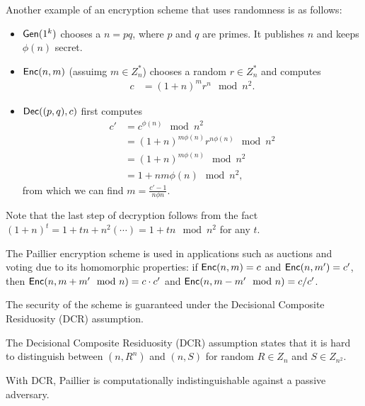 \documentclass[10pt]{article}
\begin{document}
Another example of an encryption scheme that uses randomness is as follows:

\begin{itemize}
	\item $\mathsf{Gen}(1^k)$ chooses a $n=pq$, where $p$ and $q$ are primes. It publishes $n$ and keeps $\phi(n)$ secret.
	\item $\mathsf{Enc}(n,m)$ (assuimg $m \in Z_n^*$) chooses a random $r \in Z_n^*$ and computes
	\begin{align*}
	c &= (1+n)^mr^n \mod n^2.
	\end{align*}
	\item $\mathsf{Dec}((p,q),c)$ first computes
	\begin{align*}
	c' &= c^{\phi(n)} \mod n^2 \\
	&= (1+n)^{m \phi(n)} r^{n \phi(n)} \mod n^2 \\
	&= (1+n)^{m \phi(n)} \mod n^2 \\
	&= 1+nm \phi(n) \mod n^2,
	\end{align*}
	from which we can find $m = \frac{c'-1}{n \phi n}$.
\end{itemize}
Note that the last step of decryption follows from the fact $(1+n)^t = 1 + tn + n^2 ( \cdots ) = 1+tn \mod n^2$ for any $t$.

The Paillier encryption scheme is used in applications such as auctions and voting due to its homomorphic properties: if $\mathsf{Enc}(n, m) = c$ and $\mathsf{Enc}(n, m') = c'$, then $\mathsf{Enc}(n, m+m' \mod n) = c \cdot c'$ and $\mathsf{Enc}(n, m-m' \mod n) = c / c'$.

The security of the scheme is guaranteed under the Decisional Composite Residuosity (DCR) assumption. 
\begin{definition}
	The Decisional Composite Residuosity (DCR) assumption states that it is hard to distinguish between $(n, R^n)$ and $(n, S)$ for random $R \in Z_n$ and $S \in Z_{n^2}$.
\end{definition}
\noindent With DCR, Paillier is computationally indistinguishable against a passive adversary.

\nocite{*}


\end{document}
